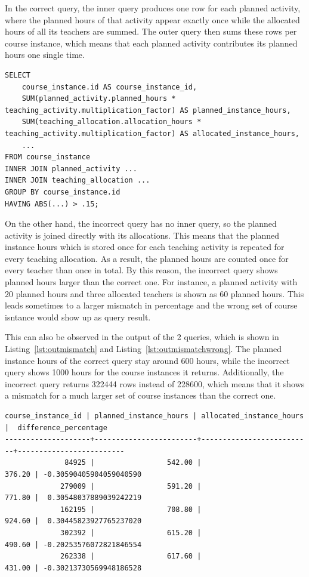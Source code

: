 \documentclass[a4paper]{scrartcl}
\renewcommand{\_}{\textunderscore\allowbreak}
\begin{document}
In the correct query, the inner query produces one row for each planned activity, where the planned hours of that activity appear exactly once while the allocated hours of all its teachers are summed. The outer query then sums these rows per course instance, which means that each planned activity contributes its planned hours one single time.

\begin{lstlisting}[style=SQL, caption={The incorrect mismatch query, where the planned hours are summed over the joined allocation rows (shortened)}, label={lst:mismatchwrong}]
SELECT
    course_instance.id AS course_instance_id,
    SUM(planned_activity.planned_hours * teaching_activity.multiplication_factor) AS planned_instance_hours,
    SUM(teaching_allocation.allocation_hours * teaching_activity.multiplication_factor) AS allocated_instance_hours,
    ...
FROM course_instance
INNER JOIN planned_activity ...
INNER JOIN teaching_allocation ...
GROUP BY course_instance.id
HAVING ABS(...) > .15;
\end{lstlisting}

On the other hand, the incorrect query has no inner query, so the planned activity is joined directly with its allocations. This means that the planned instance hours which is stored once for each teaching activity is repeated for every teaching allocation. As a result, the planned hours are counted once for every teacher than once in total. By this reason, the incorrect query shows planned hours larger than the correct one. For instance, a planned activity with 20 planned hours and three allocated teachers is shown as 60 planned hours. This leads sometimes to a larger mismatch in percentage and the wrong set of course isntance would show up as query result. 

This can also be observed in the output of the 2 queries, which is shown in Listing~\ref{lst:outmismatch} and Listing~\ref{lst:outmismatchwrong}. The planned instance hours of the correct query stay around 600 hours, while the incorrect query shows 1000 hours for the course instances it returns. Additionally, the incorrect query returns 322444 rows instead of 228600, which means that it shows a mismatch for a much larger set of course instances than the correct one.

\begin{lstlisting}[style=output, caption={The first 5 rows of the output of \texttt{mismatches.sql}, which returns 228600 rows in total}, label={lst:outmismatch}]
 course_instance_id | planned_instance_hours | allocated_instance_hours |  difference_percentage  
--------------------+------------------------+--------------------------+-------------------------
              84925 |                 542.00 |                   376.20 | -0.30590405904059040590
             279009 |                 591.20 |                   771.80 |  0.30548037889039242219
             162195 |                 708.80 |                   924.60 |  0.30445823927765237020
             302392 |                 615.20 |                   490.60 | -0.20253576072821846554
             262338 |                 617.60 |                   431.00 | -0.30213730569948186528
\end{lstlisting}
\end{document}
